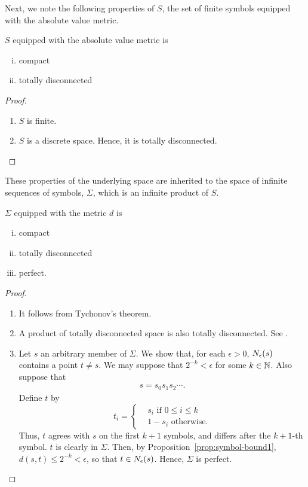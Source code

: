 \documentclass[10pt,twoside]{book}
\begin{document}
Next, we note the following properties of $S$, the set of finite symbols equipped with the absolute value metric.
\begin{proposition}
  $S$ equipped with the absolute value metric is 
  \begin{enumerate}[(i)]
    \item compact
    \item totally disconnected
  \end{enumerate}
  \begin{proof}
    \begin{enumerate}
      \item
        $S$ is finite.
      \item 
        $S$ is a discrete space.
        Hence, it is totally disconnected.
    \end{enumerate}
  \end{proof}
\end{proposition}
These properties of the underlying space are inherited to the space of infinite sequences of symbols, $\Sigma$, which is an infinite product of $S$.
\begin{proposition}
  $\Sigma$ equipped with the metric $d$ is 
  \begin{enumerate}[(i)]
    \item compact
    \item totally disconnected
    \item perfect.
  \end{enumerate}
  \begin{proof}
    \begin{enumerate}
      \item 
        It follows from Tychonov's theorem.
      \item
        A product of totally disconnected space is also totally disconnected.
        See \citet{dugundji}.
      \item
        Let $s$ an arbitrary member of $\Sigma$.
        We show that, for each $\epsilon > 0$, $N_{\epsilon}(s)$ contains a point $t \neq s$.
        We may suppose that $2^{-k} < \epsilon$ for some $k \in \mathbb{N}$.
        Also suppose that
        \begin{align*}
          s = s_0 s_1 s_2 \cdots.
        \end{align*}
        Define $t$ by
        \begin{equation*}
          t_i = \begin{cases}
            &s_i \mbox{ if } 0 \leq i \leq k  \\
            &1 - s_i \mbox{ otherwise.}
          \end{cases}
        \end{equation*}
        Thus, $t$ agrees with $s$ on the first $k+1$ symbols, and differs after the $k+1$-th symbol.
        $t$ is clearly in $\Sigma$.
        Then, by Proposition~\ref{prop:symbol-bound1}, $d(s,t) \leq 2^{-k} < \epsilon$, so that $t \in N_{\epsilon}(s)$.
        Hence, $\Sigma$ is perfect.
    \end{enumerate}
  \end{proof}
\end{proposition}
\end{document}
